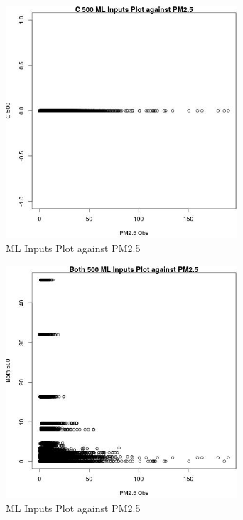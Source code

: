 \begin{figure} 
\centering  
\includegraphics[width=0.77\textwidth]{Code_Outputs/Report_ML_input_PM25_Step4_part_e_de_duplicated_aves_C_500vPM25_Obs.jpg} 
\caption{\label{fig:Report_ML_input_PM25_Step4_part_e_de_duplicated_avesC_500vPM25_Obs}ML Inputs Plot against PM2.5} 
\end{figure} 
 

\begin{figure} 
\centering  
\includegraphics[width=0.77\textwidth]{Code_Outputs/Report_ML_input_PM25_Step4_part_e_de_duplicated_aves_Both_500vPM25_Obs.jpg} 
\caption{\label{fig:Report_ML_input_PM25_Step4_part_e_de_duplicated_avesBoth_500vPM25_Obs}ML Inputs Plot against PM2.5} 
\end{figure} 
 

